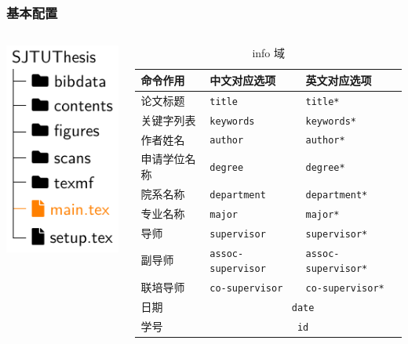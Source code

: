 \begin{frame}[label=setup]
  \frametitle{基本配置}
  \begin{columns}
    \begin{column}{0.35\textwidth}
      \includegraphics[page=3]{support/figures/thesisdir.pdf}
    \end{column}
    \begin{column}{0.65\textwidth}
      \begin{table}
        \centering
        \caption{info 域}
        \footnotesize
        \begin{tabular}{lll} \toprule
          命令作用     & 中文对应选项                      & 英文对应选项             \\ \midrule
          论文标题     & \texttt{title}                    & \texttt{title*}          \\
          关键字列表   & \texttt{keywords}                 & \texttt{keywords*}       \\
          作者姓名     & \texttt{author}                   & \texttt{author*}         \\
          申请学位名称 & \texttt{degree}                   & \texttt{degree*}         \\
          院系名称     & \texttt{department}               & \texttt{department*}     \\
          专业名称     & \texttt{major}                    & \texttt{major*}          \\
          导师         & \texttt{supervisor}               & \texttt{supervisor*}     \\
          副导师       & \texttt{assoc-supervisor}           & \texttt{assoc-supervisor*} \\
          联培导师     & \texttt{co-supervisor}              & \texttt{co-supervisor*} \\
          日期         & \multicolumn{2}{c}{\texttt{date}}                            \\
          学号         & \multicolumn{2}{c}{\texttt{id}}                              \\ \bottomrule
        \end{tabular}
      \end{table}
    \end{column}
  \end{columns}
\end{frame}

